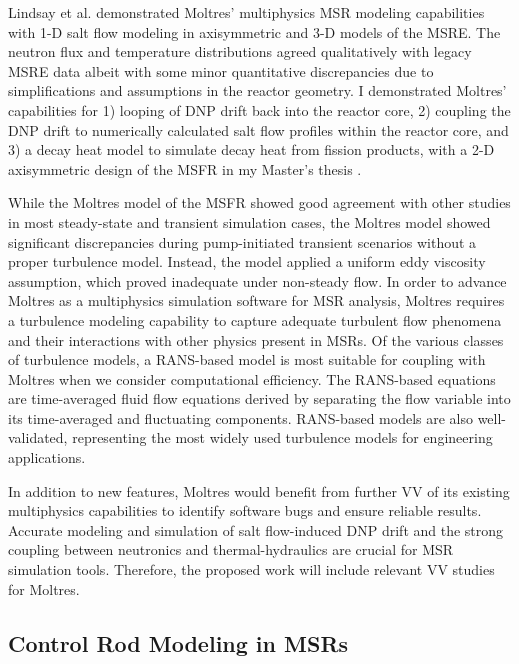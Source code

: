 Lindsay et al. \cite{lindsay_introduction_2018}
demonstrated Moltres' multiphysics \gls{MSR} modeling capabilities with 1-D salt
flow modeling in axisymmetric and 3-D models of the \gls{MSRE}. The neutron flux and
temperature distributions agreed qualitatively with legacy
\gls{MSRE} data albeit with some minor quantitative discrepancies due to
simplifications and assumptions in the reactor geometry. I demonstrated Moltres' capabilities for
1) looping of \gls{DNP} drift back into the reactor core, 2) coupling the \gls{DNP}
drift to numerically calculated salt flow profiles within the reactor core,
and 3) a decay heat model to simulate decay heat from fission products, with a 2-D axisymmetric
design of the \gls{MSFR} in my Master's thesis \cite{park_advancement_2020}.

While the Moltres
model of the \gls{MSFR} showed good agreement with other studies in most steady-state and transient
simulation cases, the Moltres model showed significant discrepancies during pump-initiated
transient scenarios without a proper turbulence model. Instead, the model applied a
uniform eddy viscosity assumption, which proved inadequate under non-steady flow. In order to
advance Moltres as a multiphysics simulation software for \gls{MSR} analysis, Moltres requires a
turbulence modeling capability to capture adequate turbulent flow phenomena and their interactions
with other physics present in \glspl{MSR}. Of the various classes of turbulence models, a
\gls{RANS}-based model is most suitable for coupling with Moltres when we consider computational
efficiency. The \gls{RANS}-based equations are time-averaged fluid flow equations
derived by separating the flow variable into its time-averaged and fluctuating components.
\gls{RANS}-based models are also well-validated, representing the most widely used turbulence
models for engineering applications.

In addition to new features, Moltres would benefit from further \gls{VV} of its existing
multiphysics capabilities to identify software bugs and ensure reliable results. Accurate modeling
and simulation of salt flow-induced \gls{DNP} drift and the strong coupling between neutronics and
thermal-hydraulics are crucial for \gls{MSR} simulation tools. Therefore, the
proposed work will include relevant \gls{VV} studies for Moltres.

\subsection{Control Rod Modeling in \glspl{MSR}}


